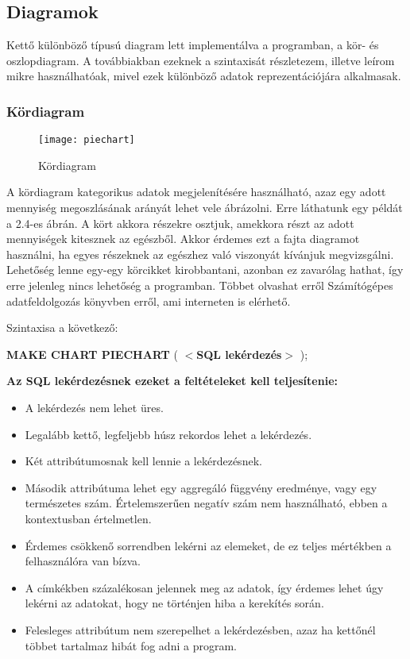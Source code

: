\subsection{Diagramok}
Kettő különböző típusú diagram lett implementálva a programban, a kör- és oszlopdiagram. A továbbiakban
ezeknek a szintaxisát részletezem, illetve leírom mikre használhatóak, mivel ezek különböző adatok
reprezentációjára alkalmasak.

\subsubsection{Kördiagram}
\begin{figure}[ht]
  \begin{center}
    \texttt{[image: piechart]}
  \end{center}
 \caption{Kördiagram}
\end{figure}

A kördiagram kategorikus adatok megjelenítésére használható, azaz egy adott mennyiség megoszlásának arányát lehet vele
ábrázolni. Erre láthatunk egy példát a 2.4-es ábrán. A kört akkora részekre osztjuk, amekkora részt az adott mennyiségek kitesznek az egészből. Akkor érdemes ezt
a fajta diagramot használni, ha egyes részeknek az egészhez való viszonyát kívánjuk megvizsgálni. Lehetőség lenne egy-egy
körcikket kirobbantani, azonban ez zavarólag hathat, így erre jelenleg nincs lehetőség a programban. Többet olvashat erről
Számítógépes adatfeldolgozás\cite{szamadat} könyvben erről, ami interneten is elérhető.

Szintaxisa a következő:

\textbf{{\color{awesomeblue} MAKE CHART PIECHART }} ( \textbf{$<$SQL lekérdezés$>$} );

\textbf{Az SQL lekérdezésnek ezeket a feltételeket kell teljesítenie:}
\begin{itemize}
  \item A lekérdezés nem lehet üres.
  \item Legalább kettő, legfeljebb húsz rekordos lehet a lekérdezés.
  \item Két attribútumosnak kell lennie a lekérdezésnek.
  \item Második attribútuma lehet egy aggregáló függvény eredménye, vagy egy természetes szám. Értelemszerűen
  negatív szám nem használható, ebben a kontextusban értelmetlen.
  \item Érdemes csökkenő sorrendben lekérni az elemeket, de ez teljes mértékben a felhasználóra van bízva.
  \item A címkékben százalékosan jelennek meg az adatok, így érdemes lehet úgy lekérni az adatokat, hogy ne történjen hiba
  a kerekítés során.
  \item Felesleges attribútum nem szerepelhet a lekérdezésben, azaz ha kettőnél többet tartalmaz hibát fog adni a program.
\end{itemize}

